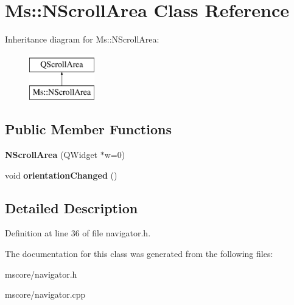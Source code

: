 \hypertarget{class_ms_1_1_n_scroll_area}{}\section{Ms\+:\+:N\+Scroll\+Area Class Reference}
\label{class_ms_1_1_n_scroll_area}
Inheritance diagram for Ms\+:\+:N\+Scroll\+Area\+:\begin{figure}[H]
\begin{center}
\leavevmode
\includegraphics[height=2.000000cm]{class_ms_1_1_n_scroll_area}
\end{center}
\end{figure}
\subsection*{Public Member Functions}
\begin{DoxyCompactItemize}
\item 
\mbox{\label{class_ms_1_1_n_scroll_area_a5694a1388866fc9754d9427371be4033}} 
{\bfseries N\+Scroll\+Area} (Q\+Widget $\ast$w=0)
\item 
\mbox{\label{class_ms_1_1_n_scroll_area_a0be08c441a525fe483969790236afea5}} 
void {\bfseries orientation\+Changed} ()
\end{DoxyCompactItemize}


\subsection{Detailed Description}


Definition at line 36 of file navigator.\+h.



The documentation for this class was generated from the following files\+:\begin{DoxyCompactItemize}
\item 
mscore/navigator.\+h\item 
mscore/navigator.\+cpp\end{DoxyCompactItemize}
